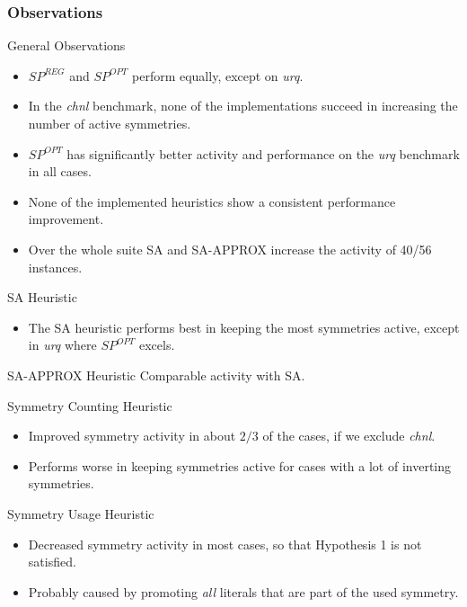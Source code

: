 \documentclass{beamer}
\begin{document}
	\begin{frame}[allowframebreaks]
		\frametitle{Observations}
		\begin{block}{General Observations}
			\begin{itemize}
				\item $SP^{REG}$ and $SP^{OPT}$ perform equally, except on \emph{urq}.
				\item In the \emph{chnl} benchmark, none of the implementations succeed in increasing the number of active symmetries.
				\item $SP^{OPT}$ has significantly better activity and performance on the \emph{urq} benchmark in all cases.
				\item None of the implemented heuristics show a consistent performance improvement.
				\item Over the whole suite SA and SA-APPROX increase the activity of 40/56
				instances.
			\end{itemize}
		\end{block}

		\begin{block}{SA Heuristic}
			\begin{itemize}
				\item The SA heuristic performs best in keeping the most symmetries active, except in \emph{urq} where $SP^{OPT}$ excels.
			\end{itemize}
		\end{block}

		\begin{block}{SA-APPROX Heuristic}
			Comparable activity with SA.
		\end{block}

		\begin{block}{Symmetry Counting Heuristic}
			\begin{itemize}
				\item Improved symmetry activity in about $2/3$ of the cases, if we exclude \emph{chnl}.
				\item Performs worse in keeping symmetries active for cases with a lot of inverting symmetries.
			\end{itemize}
		\end{block}

		\begin{block}{Symmetry Usage Heuristic}
			\begin{itemize}
				\item Decreased symmetry activity in most cases, so that Hypothesis 1 is not satisfied.
				\item Probably caused by promoting \emph{all} literals that are part of the used symmetry.
			\end{itemize}
		\end{block}
	\end{frame}
\end{document}

